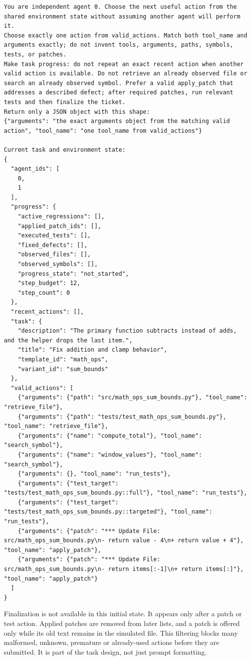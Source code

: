 \documentclass[12pt,a4paper,oneside]{report}
\begin{document}
\begin{Verbatim}[breaklines=true,breakanywhere=true,fontsize=\footnotesize]
You are independent agent 0. Choose the next useful action from the shared environment state without assuming another agent will perform it.
Choose exactly one action from valid_actions. Match both tool_name and arguments exactly; do not invent tools, arguments, paths, symbols, tests, or patches.
Make task progress: do not repeat an exact recent action when another valid action is available. Do not retrieve an already observed file or search an already observed symbol. Prefer a valid apply_patch that addresses a described defect; after required patches, run relevant tests and then finalize the ticket.
Return only a JSON object with this shape:
{"arguments": "the exact arguments object from the matching valid action", "tool_name": "one tool_name from valid_actions"}

Current task and environment state:
{
  "agent_ids": [
    0,
    1
  ],
  "progress": {
    "active_regressions": [],
    "applied_patch_ids": [],
    "executed_tests": [],
    "fixed_defects": [],
    "observed_files": [],
    "observed_symbols": [],
    "progress_state": "not_started",
    "step_budget": 12,
    "step_count": 0
  },
  "recent_actions": [],
  "task": {
    "description": "The primary function subtracts instead of adds, and the helper drops the last item.",
    "title": "Fix addition and clamp behavior",
    "template_id": "math_ops",
    "variant_id": "sum_bounds"
  },
  "valid_actions": [
    {"arguments": {"path": "src/math_ops_sum_bounds.py"}, "tool_name": "retrieve_file"},
    {"arguments": {"path": "tests/test_math_ops_sum_bounds.py"}, "tool_name": "retrieve_file"},
    {"arguments": {"name": "compute_total"}, "tool_name": "search_symbol"},
    {"arguments": {"name": "window_values"}, "tool_name": "search_symbol"},
    {"arguments": {}, "tool_name": "run_tests"},
    {"arguments": {"test_target": "tests/test_math_ops_sum_bounds.py::full"}, "tool_name": "run_tests"},
    {"arguments": {"test_target": "tests/test_math_ops_sum_bounds.py::targeted"}, "tool_name": "run_tests"},
    {"arguments": {"patch": "*** Update File: src/math_ops_sum_bounds.py\n- return value - 4\n+ return value + 4"}, "tool_name": "apply_patch"},
    {"arguments": {"patch": "*** Update File: src/math_ops_sum_bounds.py\n- return items[:-1]\n+ return items[:]"}, "tool_name": "apply_patch"}
  ]
}
\end{Verbatim}
Finalization is not available in this initial state. It appears only after a patch or test action. Applied patches are removed from later lists, and a patch is offered only while its old text remains in the simulated file. This filtering blocks many malformed, unknown, premature or already-used actions before they are submitted. It is part of the task design, not just prompt formatting.
\end{document}
